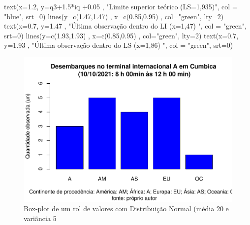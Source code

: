 \documentclass[
]{book}
\newenvironment{Shaded}{\begin{snugshade}}{\end{snugshade}}
\newcommand{\AttributeTok}[1]{\textcolor[rgb]{0.77,0.63,0.00}{#1}}
\newcommand{\DecValTok}[1]{\textcolor[rgb]{0.00,0.00,0.81}{#1}}
\newcommand{\FloatTok}[1]{\textcolor[rgb]{0.00,0.00,0.81}{#1}}
\newcommand{\FunctionTok}[1]{\textcolor[rgb]{0.00,0.00,0.00}{#1}}
\newcommand{\NormalTok}[1]{#1}
\newcommand{\SpecialCharTok}[1]{\textcolor[rgb]{0.00,0.00,0.00}{#1}}
\newcommand{\StringTok}[1]{\textcolor[rgb]{0.31,0.60,0.02}{#1}}
\begin{document}
\begin{Shaded}
\begin{Highlighting}[]
\FunctionTok{text}\NormalTok{(}\AttributeTok{x=}\FloatTok{1.2}\NormalTok{, }\AttributeTok{y=}\NormalTok{q3}\FloatTok{+1.5}\SpecialCharTok{*}\NormalTok{iq }\SpecialCharTok{+}\FloatTok{0.05}\NormalTok{ , }\StringTok{"Limite superior teórico (LS=1,935)"}\NormalTok{, }\AttributeTok{col =} \StringTok{"blue"}\NormalTok{, }\AttributeTok{srt=}\DecValTok{0}\NormalTok{)}
\FunctionTok{lines}\NormalTok{(}\AttributeTok{y=}\FunctionTok{c}\NormalTok{(}\FloatTok{1.47}\NormalTok{,}\FloatTok{1.47}\NormalTok{) , }\AttributeTok{x=}\FunctionTok{c}\NormalTok{(}\FloatTok{0.85}\NormalTok{,}\FloatTok{0.95}\NormalTok{) , }\AttributeTok{col=}\StringTok{"green"}\NormalTok{, }\AttributeTok{lty=}\DecValTok{2}\NormalTok{) }
\FunctionTok{text}\NormalTok{(}\AttributeTok{x=}\FloatTok{0.7}\NormalTok{, }\AttributeTok{y=}\FloatTok{1.47}\NormalTok{ , }\StringTok{"Última observação dentro do LI (x=1,47) "}\NormalTok{, }\AttributeTok{col =} \StringTok{"green"}\NormalTok{, }\AttributeTok{srt=}\DecValTok{0}\NormalTok{)}
\FunctionTok{lines}\NormalTok{(}\AttributeTok{y=}\FunctionTok{c}\NormalTok{(}\FloatTok{1.93}\NormalTok{,}\FloatTok{1.93}\NormalTok{) , }\AttributeTok{x=}\FunctionTok{c}\NormalTok{(}\FloatTok{0.85}\NormalTok{,}\FloatTok{0.95}\NormalTok{) , }\AttributeTok{col=}\StringTok{"green"}\NormalTok{, }\AttributeTok{lty=}\DecValTok{2}\NormalTok{) }
\FunctionTok{text}\NormalTok{(}\AttributeTok{x=}\FloatTok{0.7}\NormalTok{, }\AttributeTok{y=}\FloatTok{1.93}\NormalTok{ , }\StringTok{"Última observação dentro do LS (x=1,86) "}\NormalTok{, }\AttributeTok{col =} \StringTok{"green"}\NormalTok{, }\AttributeTok{srt=}\DecValTok{0}\NormalTok{)}
\end{Highlighting}
\end{Shaded}

\begin{figure}

{\centering \includegraphics{apostila_files/figure-latex/unnamed-chunk-52-1} 

}

\caption{Box-plot de um rol de valores com Distribuição Normal (média 20 e variãncia 5}\label{fig:unnamed-chunk-52}
\end{figure}
\end{document}
